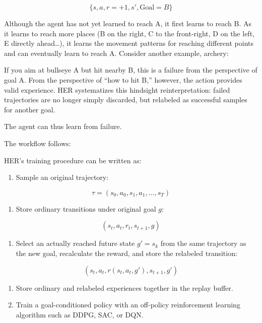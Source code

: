 \[
\{s,a,r=+1,s',\mathrm{Goal}=B\}
\]

Although the agent has not yet learned to reach A, it first learns to reach B. As it learns to reach more places (B on the right, C to the front-right, D on the left, E directly ahead\ldots), it learns the movement patterns for reaching different points and can eventually learn to reach A. Consider another example, archery:

If you aim at bullseye A but hit nearby B, this is a failure from the perspective of goal A. From the perspective of ``how to hit B,'' however, the action provides valid experience. HER systematizes this hindsight reinterpretation: failed trajectories are no longer simply discarded, but relabeled as successful samples for another goal.

The agent can thus learn from failure.

The workflow follows:

HER's training procedure can be written as:

\begin{enumerate}
\def\labelenumi{\arabic{enumi}.}
\tightlist
\item
{}
  Sample an original trajectory:
\end{enumerate}

\[
\tau=(s_0,a_0,s_1,a_1,\ldots,s_T)
\]

\begin{enumerate}
\def\labelenumi{\arabic{enumi}.}
\setcounter{enumi}{1}
\tightlist
\item
{}
  Store ordinary transitions under original goal \(g\):
\end{enumerate}

\[
(s_t,a_t,r_t,s_{t+1},g)
\]

\begin{enumerate}
\def\labelenumi{\arabic{enumi}.}
\setcounter{enumi}{2}
\tightlist
\item
{}
  Select an actually reached future state \(g'=s_k\) from the same trajectory as the new goal, recalculate the reward, and store the relabeled transition:
\end{enumerate}

\[
(s_t,a_t,r(s_t,a_t,g'),s_{t+1},g')
\]

\begin{enumerate}
\def\labelenumi{\arabic{enumi}.}
\setcounter{enumi}{3}
\tightlist
\item
  Store ordinary and relabeled experiences together in the replay buffer.
\item
  Train a goal-conditioned policy with an off-policy reinforcement learning algorithm such as DDPG, SAC, or DQN.
\end{enumerate}

